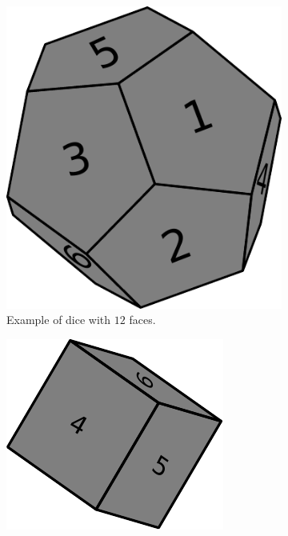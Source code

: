 \begin{figure}
	\centering
	\begin{subfigure}[t]{0.25\textwidth}
		\includegraphics[width=1\linewidth]{sources/dice_rolls/images/3d_dices}
		\caption{Example of dice with $12$ faces.}
		\label{fig:dice_rolls:12faces_dice}
	 \end{subfigure}
	\hfill
	\begin{subfigure}[t]{0.25\textwidth}
		\includegraphics[width=1\linewidth]{sources/dice_rolls/images/cubic_dice}

\end{subfigure}
\end{figure}
